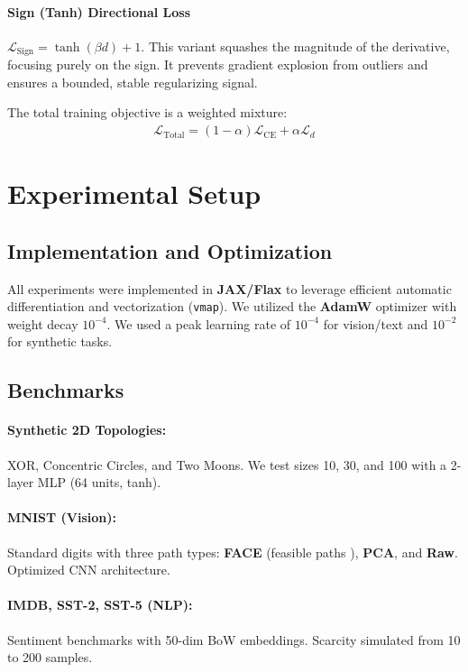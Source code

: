 \documentclass[sigconf,anonymous]{aamas}
\begin{document}
\paragraph{Sign (Tanh) Directional Loss}
$\mathcal{L}_{\text{Sign}} = \tanh(\beta d) + 1$. This variant squashes the magnitude of the derivative, focusing purely on the sign. It prevents gradient explosion from outliers and ensures a bounded, stable regularizing signal.

The total training objective is a weighted mixture:
\begin{align}\label{eq:lambda}
    \mathcal{L}_{\text{Total}} = (1-\alpha)\mathcal{L}_{\textrm{CE}} + \alpha \mathcal{L}_{d}
\end{align}

\section{Experimental Setup}
\label{sec:experimental_setup}

\subsection{Implementation and Optimization}
All experiments were implemented in \textbf{JAX/Flax} to leverage efficient automatic differentiation and vectorization (\texttt{vmap}). We utilized the \textbf{AdamW} optimizer with weight decay $10^{-4}$. We used a peak learning rate of $10^{-4}$ for vision/text and $10^{-2}$ for synthetic tasks.

\subsection{Benchmarks}
\paragraph{Synthetic 2D Topologies:} XOR, Concentric Circles, and Two Moons. We test sizes 10, 30, and 100 with a 2-layer MLP (64 units, tanh).
\paragraph{MNIST (Vision):} Standard digits with three path types: \textbf{FACE} (feasible paths \cite{poyiadzi2020face}), \textbf{PCA}, and \textbf{Raw}. Optimized CNN architecture.
\paragraph{IMDB, SST-2, SST-5 (NLP):} Sentiment benchmarks with 50-dim BoW embeddings. Scarcity simulated from 10 to 200 samples.
\end{document}
